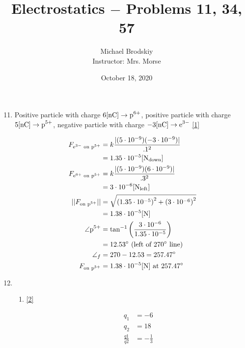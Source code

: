 \documentclass[12pt]{article}
\title{Electrostatics $-$ Problems 11, 34, 57}
\date{October 18, 2020}
\author{Michael Brodskiy\\ \small Instructor: Mrs. Morse}
\begin{document}
\maketitle

\begin{enumerate}

    \setcounter{enumi}{10}

  \item Positive particle with charge $6[\si{\nano\coulomb}] \rightarrow \ce{p^6+}$, positive particle with charge $5[\si{\nano\coulomb}] \rightarrow \ce{p^5+}$, negative particle with charge $-3[\si{\nano\coulomb}] \rightarrow \ce{e^3-}$ \eqref{1}

    \begin{equation}
      \begin{split}
        F_{\ce{e^3-}\text{ on } \ce{p^5+}} &= k\frac{|(5\cdot10^{-9})(-3\cdot10^{-9})|}{.1^2}\\
        &=1.35\cdot10^{-5}[\si{\newton}_{\text{down}}]\\
        F_{\ce{e^6+}\text{ on } \ce{p^5+}} &= k\frac{|(5\cdot10^{-9})(6\cdot10^{-9})|}{.3^2}\\
        &=3\cdot10^{-6}[\si{\newton}_{\text{left}}]\\
        ||F_{\text{on }\ce{p^5+}}||&= \sqrt{\left( 1.35\cdot10^{-5} \right)^2 + \left( 3\cdot10^{-6} \right)^2}\\
        &=1.38\cdot10^{-5}[\si{\newton}]\\
        \angle\ce{p^5+}&=\tan^{-1}\left( \frac{3\cdot10^{-6}}{1.35\cdot10^{-5}} \right)\\
        &=12.53^{\circ} \text{ (left of $270^{\circ}$ line)}\\
        \angle_f&= 270-12.53=257.47^{\circ}\\
        F_{\text{on }\ce{p^5+}}&=1.38\cdot10^{-5}[\si{\newton}]\text{ at }257.47^{\circ}
      \end{split}
      \label{1}
    \end{equation}

    \setcounter{enumi}{33}

  \item 

    \begin{enumerate}

      \item \eqref{2}

        \begin{equation}
          \begin{split}
            q_1&=-6\\
            q_2&=18\\
            \frac{q1}{q2}&=-\frac{1}{3}\\
          \end{split}
          \label{2}
        \end{equation}


\end{enumerate}
\end{enumerate}
\end{document}
